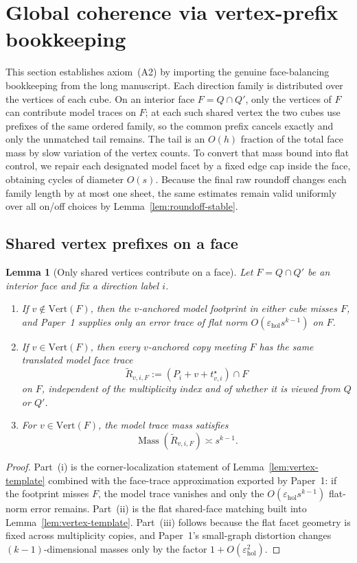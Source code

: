 \documentclass[11pt]{article}
\numberwithin{equation}{section}
\theoremstyle{plain}
\newtheorem{lemma}[theorem]{Lemma}
\theoremstyle{definition}
\theoremstyle{remark}
\DeclareMathOperator{\Mass}{Mass}
\newcommand{\eps}{\varepsilon}
\begin{document}
\section{Global coherence via vertex-prefix bookkeeping}\label{sec:coherence}

This section establishes axiom~(A2) by importing the genuine face-balancing bookkeeping from the long manuscript.  Each direction family is distributed over the vertices of each cube.  On an interior face $F=Q\cap Q'$, only the vertices of $F$ can contribute model traces on $F$; at each such shared vertex the two cubes use prefixes of the same ordered family, so the common prefix cancels exactly and only the unmatched tail remains.  The tail is an $O(h)$ fraction of the total face mass by slow variation of the vertex counts.  To convert that mass bound into flat control, we repair each designated model facet by a fixed edge cap inside the face, obtaining cycles of diameter $O(s)$.  Because the final raw roundoff changes each family length by at most one sheet, the same estimates remain valid uniformly over all on/off choices by Lemma~\ref{lem:roundoff-stable}.

\subsection{Shared vertex prefixes on a face}

\begin{lemma}[Only shared vertices contribute on a face]\label{lem:face-vertices}
Let $F=Q\cap Q'$ be an interior face and fix a direction label $i$.
\begin{enumerate}
\item[\textnormal{(i)}] If $v\notin\mathrm{Vert}(F)$, then the $v$-anchored model footprint in either cube misses $F$, and Paper~1 supplies only an error trace of flat norm $O(\eps_{\mathrm{hol}}s^{k-1})$ on $F$.
\item[\textnormal{(ii)}] If $v\in\mathrm{Vert}(F)$, then every $v$-anchored copy meeting $F$ has the same translated model face trace
\[
\widetilde R_{v,i,F}:=(P_i+v+t_{v,i}^\star)\cap F
\]
on $F$, independent of the multiplicity index and of whether it is viewed from $Q$ or $Q'$.
\item[\textnormal{(iii)}] For $v\in\mathrm{Vert}(F)$, the model trace mass satisfies
\[
\Mass(\widetilde R_{v,i,F})\asymp s^{k-1}.
\]
\end{enumerate}
\end{lemma}

\begin{proof}
Part~\textnormal{(i)} is the corner-localization statement of Lemma~\ref{lem:vertex-template} combined with the face-trace approximation exported by Paper~1: if the footprint misses $F$, the model trace vanishes and only the $O(\eps_{\mathrm{hol}}s^{k-1})$ flat-norm error remains.  Part~\textnormal{(ii)} is the flat shared-face matching built into Lemma~\ref{lem:vertex-template}.  Part~\textnormal{(iii)} follows because the flat facet geometry is fixed across multiplicity copies, and Paper~1's small-graph distortion changes $(k-1)$-dimensional masses only by the factor $1+O(\eps_{\mathrm{hol}}^2)$.
\end{proof}
\end{document}
